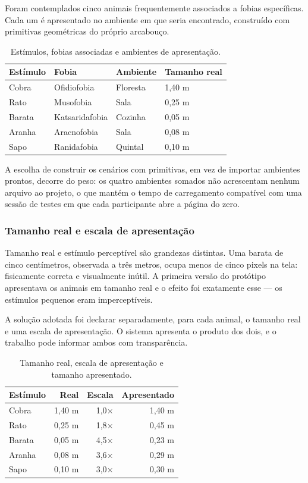 Foram contemplados cinco animais frequentemente associados a fobias
específicas. Cada um é apresentado no ambiente em que seria encontrado,
construído com primitivas geométricas do próprio arcabouço.

\begin{table}[htbp]
\centering
\caption{Estímulos, fobias associadas e ambientes de apresentação.}
\label{tab:estimulos}
\begin{tabular}{llll}
\toprule
\textbf{Estímulo} & \textbf{Fobia} & \textbf{Ambiente} & \textbf{Tamanho real} \\
\midrule
Cobra  & Ofidiofobia     & Floresta & 1,40 m \\
Rato   & Musofobia       & Sala     & 0,25 m \\
Barata & Katsaridafobia  & Cozinha  & 0,05 m \\
Aranha & Aracnofobia     & Sala     & 0,08 m \\
Sapo   & Ranidafobia     & Quintal  & 0,10 m \\
\bottomrule
\end{tabular}
\end{table}

A escolha de construir os cenários com primitivas, em vez de importar
ambientes prontos, decorre do peso: os quatro ambientes somados não
acrescentam nenhum arquivo ao projeto, o que mantém o tempo de
carregamento compatível com uma sessão de testes em que cada participante
abre a página do zero.

\subsubsection{Tamanho real e escala de apresentação}

Tamanho real e estímulo perceptível são grandezas distintas. Uma barata
de cinco centímetros, observada a três metros, ocupa menos de cinco
pixels na tela: fisicamente correta e visualmente inútil. A primeira
versão do protótipo apresentava os animais em tamanho real e o efeito
foi exatamente esse --- os estímulos pequenos eram imperceptíveis.

A solução adotada foi declarar separadamente, para cada animal, o tamanho
real e uma escala de apresentação. O sistema apresenta o produto dos
dois, e o trabalho pode informar ambos com transparência.

\begin{table}[htbp]
\centering
\caption{Tamanho real, escala de apresentação e tamanho apresentado.}
\label{tab:escalas}
\begin{tabular}{lrrr}
\toprule
\textbf{Estímulo} & \textbf{Real} & \textbf{Escala} & \textbf{Apresentado} \\
\midrule
Cobra  & 1,40 m & 1,0$\times$ & 1,40 m \\
Rato   & 0,25 m & 1,8$\times$ & 0,45 m \\
Barata & 0,05 m & 4,5$\times$ & 0,23 m \\
Aranha & 0,08 m & 3,6$\times$ & 0,29 m \\
Sapo   & 0,10 m & 3,0$\times$ & 0,30 m \\
\bottomrule
\end{tabular}
\end{table}

